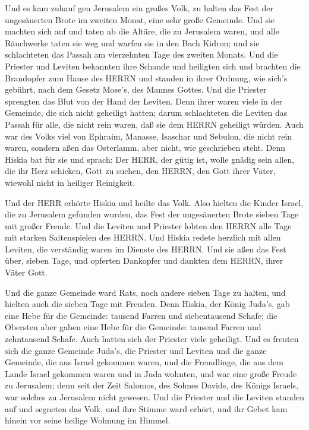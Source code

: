  Und es kam zuhauf gen Jerusalem ein großes Volk, zu halten
das Fest der ungesäuerten Brote im zweiten Monat, eine sehr große
Gemeinde.  Und sie machten sich auf und taten ab die
Altäre, die zu Jerusalem waren, und alle Räuchwerke taten sie weg und
warfen sie in den Bach Kidron;  und sie schlachteten das
Passah am vierzehnten Tage des zweiten Monats. Und die Priester und
Leviten bekannten ihre Schande und heiligten sich und brachten die
Brandopfer zum Hause des HERRN  und standen in ihrer
Ordnung, wie sich's gebührt, nach dem Gesetz Mose's, des Mannes Gottes.
Und die Priester sprengten das Blut von der Hand der Leviten.
 Denn ihrer waren viele in der Gemeinde, die sich nicht
geheiligt hatten; darum schlachteten die Leviten das Passah für alle,
die nicht rein waren, daß sie dem HERRN geheiligt würden. 
Auch war des Volks viel von Ephraim, Manasse, Isaschar und Sebulon, die
nicht rein waren, sondern aßen das Osterlamm, aber nicht, wie
geschrieben steht. Denn Hiskia bat für sie und sprach: Der HERR, der
gütig ist, wolle gnädig sein  allen, die ihr Herz schicken,
Gott zu suchen, den HERRN, den Gott ihrer Väter, wiewohl nicht in
heiliger Reinigkeit.

 Und der HERR erhörte Hiskia und heilte das Volk.
 Also hielten die Kinder Israel, die zu Jerusalem gefunden
wurden, das Fest der ungesäuerten Brote sieben Tage mit großer Freude.
Und die Leviten und Priester lobten den HERRN alle Tage mit starken
Saitenspielen des HERRN.  Und Hiskia redete herzlich mit
allen Leviten, die verständig waren im Dienste des HERRN. Und sie aßen
das Fest über, sieben Tage, und opferten Dankopfer und dankten dem
HERRN, ihrer Väter Gott.

 Und die ganze Gemeinde ward Rats, noch andere sieben Tage
zu halten, und hielten auch die sieben Tage mit Freuden. 
Denn Hiskia, der König Juda's, gab eine Hebe für die Gemeinde: tausend
Farren und siebentausend Schafe; die Obersten aber gaben eine Hebe für
die Gemeinde: tausend Farren und zehntausend Schafe. Auch hatten sich
der Priester viele geheiligt.  Und es freuten sich die
ganze Gemeinde Juda's, die Priester und Leviten und die ganze Gemeinde,
die aus Israel gekommen waren, und die Fremdlinge, die aus dem Lande
Israel gekommen waren und in Juda wohnten,  und war eine
große Freude zu Jerusalem; denn seit der Zeit Salomos, des Sohnes
Davids, des Königs Israels, war solches zu Jerusalem nicht gewesen.
 Und die Priester und die Leviten standen auf und segneten
das Volk, und ihre Stimme ward erhört, und ihr Gebet kam hinein vor
seine heilige Wohnung im Himmel.

